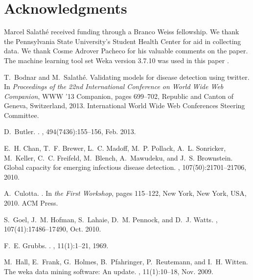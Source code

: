 \documentclass{sig-alternate-2013}
\begin{document}
\section{Acknowledgments}

Marcel Salath\'e received funding through a Branco Weiss fellowship. We thank the Pennsylvania State University's Student Health Center for aid in collecting data. We thank Cosme Adrover Pacheco for his valuable comments on the paper. The machine learning tool set Weka version 3.7.10 was used in this paper \cite{Hall:2009ud}.
\begin{thebibliography}{10}

T.~Bodnar and M.~Salath{\'e}.
\newblock Validating models for disease detection using twitter.
\newblock In {\em Proceedings of the 22nd International Conference on World
  Wide Web Companion}, WWW '13 Companion, pages 699--702, Republic and Canton
  of Geneva, Switzerland, 2013. International World Wide Web Conferences
  Steering Committee.

D.~Butler.
.
, 494(7436):155--156, Feb. 2013.

E.~H. Chan, T.~F. Brewer, L.~C. Madoff, M.~P. Pollack, A.~L. Sonricker,
  M.~Keller, C.~C. Freifeld, M.~Blench, A.~Mawudeku, and J.~S. Brownstein.
\newblock Global capacity for emerging infectious disease detection.
,
  107(50):21701--21706, 2010.

A.~Culotta.
.
\newblock In {\em the First Workshop}, pages 115--122, New York, New York, USA,
  2010. ACM Press.

S.~Goel, J.~M. Hofman, S.~Lahaie, D.~M. Pennock, and D.~J. Watts.
, 107(41):17486--17490, Oct. 2010.

F.~E. Grubbs.
.
, 11(1):1--21, 1969.

M.~Hall, E.~Frank, G.~Holmes, B.~Pfahringer, P.~Reutemann, and I.~H. Witten.
\newblock The weka data mining software: An update.
, 11(1):10--18, Nov. 2009.


\end{thebibliography}
\end{document}
